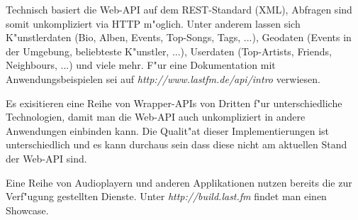 Technisch basiert die Web-API auf dem REST-Standard (XML), Abfragen sind somit unkompliziert via HTTP m"oglich. Unter anderem lassen sich K"unstlerdaten (Bio, Alben, Events, Top-Songs, Tags, ...), Geodaten (Events in der Umgebung, beliebteste K"unstler, ...), Userdaten (Top-Artists, Friends, Neighbours, ...) und viele mehr. F"ur eine Dokumentation mit Anwendungsbeispielen sei auf \textit{http://www.lastfm.de/api/intro} verwiesen. 

Es exisitieren eine Reihe von Wrapper-APIs von Dritten f"ur unterschiedliche Technologien, damit man die Web-API auch unkompliziert in andere Anwendungen einbinden kann. Die Qualit"at dieser Implementierungen ist unterschiedlich und es kann durchaus sein dass diese nicht am aktuellen Stand der Web-API sind.

Eine Reihe von Audioplayern und anderen Applikationen nutzen bereits die zur Verf"ugung gestellten Dienste. Unter \textit{http://build.last.fm} findet man einen Showcase.
